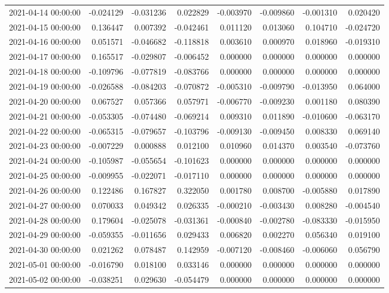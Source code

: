 \begin{tabular}{lrrrrrrr}
2021-04-14 00:00:00 & -0.024129 & -0.031236 & 0.022829 & -0.003970 & -0.009860 & -0.001310 & 0.020420 \\
2021-04-15 00:00:00 & 0.136447 & 0.007392 & -0.042461 & 0.011120 & 0.013060 & 0.104710 & -0.024720 \\
2021-04-16 00:00:00 & 0.051571 & -0.046682 & -0.118818 & 0.003610 & 0.000970 & 0.018960 & -0.019310 \\
2021-04-17 00:00:00 & 0.165517 & -0.029807 & -0.006452 & 0.000000 & 0.000000 & 0.000000 & 0.000000 \\
2021-04-18 00:00:00 & -0.109796 & -0.077819 & -0.083766 & 0.000000 & 0.000000 & 0.000000 & 0.000000 \\
2021-04-19 00:00:00 & -0.026588 & -0.084203 & -0.070872 & -0.005310 & -0.009790 & -0.013950 & 0.064000 \\
2021-04-20 00:00:00 & 0.067527 & 0.057366 & 0.057971 & -0.006770 & -0.009230 & 0.001180 & 0.080390 \\
2021-04-21 00:00:00 & -0.053305 & -0.074480 & -0.069214 & 0.009310 & 0.011890 & -0.010600 & -0.063170 \\
2021-04-22 00:00:00 & -0.065315 & -0.079657 & -0.103796 & -0.009130 & -0.009450 & 0.008330 & 0.069140 \\
2021-04-23 00:00:00 & -0.007229 & 0.000888 & 0.012100 & 0.010960 & 0.014370 & 0.003540 & -0.073760 \\
2021-04-24 00:00:00 & -0.105987 & -0.055654 & -0.101623 & 0.000000 & 0.000000 & 0.000000 & 0.000000 \\
2021-04-25 00:00:00 & -0.009955 & -0.022071 & -0.017110 & 0.000000 & 0.000000 & 0.000000 & 0.000000 \\
2021-04-26 00:00:00 & 0.122486 & 0.167827 & 0.322050 & 0.001780 & 0.008700 & -0.005880 & 0.017890 \\
2021-04-27 00:00:00 & 0.070033 & 0.049342 & 0.026335 & -0.000210 & -0.003430 & 0.008280 & -0.004540 \\
2021-04-28 00:00:00 & 0.179604 & -0.025078 & -0.031361 & -0.000840 & -0.002780 & -0.083330 & -0.015950 \\
2021-04-29 00:00:00 & -0.059355 & -0.011656 & 0.029433 & 0.006820 & 0.002270 & 0.056340 & 0.019100 \\
2021-04-30 00:00:00 & 0.021262 & 0.078487 & 0.142959 & -0.007120 & -0.008460 & -0.006060 & 0.056790 \\
2021-05-01 00:00:00 & -0.016790 & 0.018100 & 0.033146 & 0.000000 & 0.000000 & 0.000000 & 0.000000 \\
2021-05-02 00:00:00 & -0.038251 & 0.029630 & -0.054479 & 0.000000 & 0.000000 & 0.000000 & 0.000000 \\

\end{tabular}
